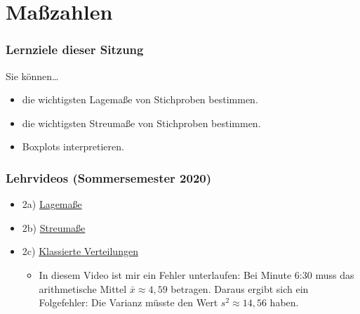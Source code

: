 \documentclass[
  11pt,
  ngerman,
  a4paper,
]{report}
\providecommand{\tightlist}{%
  \setlength{\itemsep}{0pt}\setlength{\parskip}{0pt}}
\begin{document}
\hypertarget{mauxdfzahlen}{%
\chapter{Maßzahlen}\label{mauxdfzahlen}}

\hypertarget{lernziele-dieser-sitzung-1}{%
\subsection*{Lernziele dieser Sitzung}\label{lernziele-dieser-sitzung-1}}

Sie können\ldots{}

\begin{itemize}
\tightlist
\item
  die wichtigsten Lagemaße von Stichproben bestimmen.
\item
  die wichtigsten Streumaße von Stichproben bestimmen.
\item
  Boxplots interpretieren.
\end{itemize}

\hypertarget{lehrvideos-sommersemester-2020-1}{%
\subsection*{Lehrvideos (Sommersemester 2020)}\label{lehrvideos-sommersemester-2020-1}}

\begin{itemize}
\tightlist
\item
  2a) \href{https://video01.uni-frankfurt.de/Mediasite/Play/bbb30f8025cf48e99a48700b0600e1e11d}{Lagemaße}
\item
  2b) \href{https://video01.uni-frankfurt.de/Mediasite/Play/cfdb254c058f44228e7b026f36986cc31d}{Streumaße}
\item
  2c) \href{https://video01.uni-frankfurt.de/Mediasite/Play/d115769da4ee4e25a9062a9b2e2e11c41d}{Klassierte Verteilungen}

  \begin{itemize}
  \tightlist
  \item
    In diesem Video ist mir ein Fehler unterlaufen: Bei Minute 6:30 muss das arithmetische Mittel \(\bar{x}\approx4{,}59\) betragen. Daraus ergibt sich ein Folgefehler: Die Varianz müsste den Wert \(s^2\approx14{,}56\) haben.
  \end{itemize}
\end{itemize}
\end{document}
